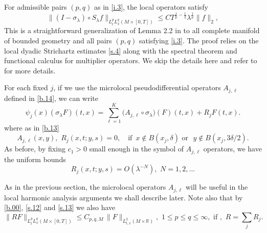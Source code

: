 \documentclass[10pt]{amsart}
\newcommand{\la}{\lambda}
\newcommand{\1}{{\bf 1}}
\newcommand{\R}{{\mathbb R}}
\begin{document}
For admissible pairs $(p,q)$ as in \eqref{i.3}, the local
operators  satisfy
\begin{equation}\label{s.9}
\|(I-\sigma_\la)\circ S_\la f\|_{L^p_tL^q_x(M\times [0,T])}\le CT^{\frac1{p}-\frac12}\la^{\frac1{p}}\|f\|_2,
\end{equation}
This is a straightforward generalization of Lemma 2.2 in \cite{blair2023strichartz} to all complete manifold of bounded geometry and all
 pairs $(p, q)$ satisfying \eqref{i.3}. The proof relies on the local dyadic Strichartz estimates \eqref{s.4} along with the spectral theorem and functional calculus for multiplier operators. We skip the details here and refer to \cite{blair2023strichartz}
for more details.


For each fixed $j$, if we use the microlocal pseudodifferential operators $A_{j,\ell}$ defined in \eqref{b.14}, we can write
\begin{equation}\label{s.11}
\psi_j(x) (\sigma_\la F)(t,x)=\sum_{\ell=1}^K \bigl(A_{j,\ell} \circ\sigma_\la\bigr)(F)(t,x)+R_jF(t,x).
\end{equation}
where as in \eqref{b.13}
\begin{equation}\label{s.12}
A_{j,\ell}(x,y), \, \, R_j(x, t;y, s)=0, \quad \text{if } \, x\notin B(x_j,\delta) \, \,
\text{or } \, \, y\notin B(x_j,3\delta/2).
\end{equation}
As before, by fixing $c_1>0$ small enough in the symbol of $A_{j,\ell}$ operators,
we have the uniform
bounds
\begin{equation}\label{s.13}
R_j(x, t; y, s)=O(\la^{-N}), \,\, N=1,2,...
\end{equation}


As in the previous section, the microlocal operators $A_{j,\ell}$ will be useful in the local harmonic analysis arguments we shall describe later.
Note also that by \eqref{b.00}, \eqref{s.12} and \eqref{s.13} we also have
\begin{equation}\label{s.14}
\|RF\|_{L^p_tL^q_x(M\times [0,T])}\le C_{p,q,M} \, \|F\|_{L^2_{t,x}(M\times\R)}, \, \, 1\le p\le q\le \infty, \, \,
\text{if }, \, \, R=\sum_j R_j.
\end{equation}
\end{document}
